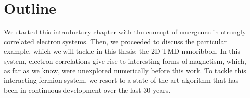 \section{Outline}
\label{sec:int_outline}

We started this introductory chapter with the concept of emergence in strongly correlated electron systems.
Then, we proceeded to discuss the particular example, which we will tackle in this thesis: the \acs{2D} \acs{TMD} nanoribbon.
In this system, electron correlations give rise to interesting forms of magnetism, which, as far as we know, were unexplored numerically before this work.
To tackle this interacting fermion system, we resort to a  state-of-the-art algorithm that has been in continuous development over the last 30 years.